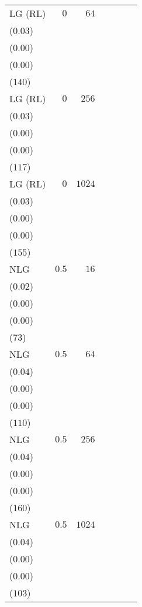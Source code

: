 \begin{table*}[t]
\begin{tabular}{lrrrrrr}
LG {\scriptsize(RL)} & \(0\) & \(64\) & \longcell{\(0.13\)\\{\tiny(\(0.03\))}} & \longcell{\(0.00\)\\{\tiny(\(0.00\))}} & \longcell{\(0.85\)\\{\tiny(\(0.00\))}} & \longcell{\(6061\)\\{\tiny(\(140\))}} \\[2.2ex]
LG {\scriptsize(RL)} & \(0\) & \(256\) & \longcell{\(0.19\)\\{\tiny(\(0.03\))}} & \longcell{\(0.00\)\\{\tiny(\(0.00\))}} & \longcell{\(0.85\)\\{\tiny(\(0.00\))}} & \longcell{\(5896\)\\{\tiny(\(117\))}} \\[2.2ex]
LG {\scriptsize(RL)} & \(0\) & \(1024\) & \longcell{\(0.26\)\\{\tiny(\(0.03\))}} & \longcell{\(0.00\)\\{\tiny(\(0.00\))}} & \longcell{\(0.85\)\\{\tiny(\(0.00\))}} & \longcell{\(5871\)\\{\tiny(\(155\))}} \\[2.2ex]
NLG & \(0.5\) & \(16\) & \longcell{\(0.06\)\\{\tiny(\(0.02\))}} & \longcell{\(0.00\)\\{\tiny(\(0.00\))}} & \longcell{\(0.85\)\\{\tiny(\(0.00\))}} & \longcell{\(6196\)\\{\tiny(\(73\))}} \\[2.2ex]
NLG & \(0.5\) & \(64\) & \longcell{\(0.11\)\\{\tiny(\(0.04\))}} & \longcell{\(0.00\)\\{\tiny(\(0.00\))}} & \longcell{\(0.85\)\\{\tiny(\(0.00\))}} & \longcell{\(6096\)\\{\tiny(\(110\))}} \\[2.2ex]
NLG & \(0.5\) & \(256\) & \longcell{\(0.20\)\\{\tiny(\(0.04\))}} & \longcell{\(0.00\)\\{\tiny(\(0.00\))}} & \longcell{\(0.85\)\\{\tiny(\(0.00\))}} & \longcell{\(5968\)\\{\tiny(\(160\))}} \\[2.2ex]
NLG & \(0.5\) & \(1024\) & \longcell{\(0.31\)\\{\tiny(\(0.04\))}} & \longcell{\(0.00\)\\{\tiny(\(0.00\))}} & \longcell{\(0.85\)\\{\tiny(\(0.00\))}} & \longcell{\(5833\)\\{\tiny(\(103\))}} \\[2.2ex]

\end{tabular}
\end{table*}
